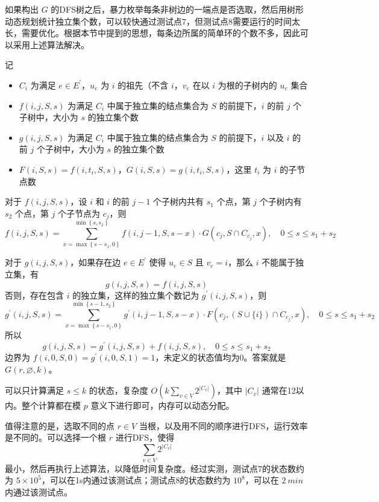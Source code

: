 \documentclass[lang=cn,11pt,a4paper]{elegantpaper}
\begin{document}
如果构出 $G$ 的DFS树之后，暴力枚举每条非树边的一端点是否选取，然后用树形动态规划统计独立集个数，可以较快通过测试点7，但测试点8需要运行的时间太长，需要优化。根据本节中提到的思想，每条边所属的简单环的个数不多，因此可以采用上述算法解决。

记
\begin{itemize}
    \item $C_i$ 为满足 $e \in E^{'}$，$u_e$ 为 $i$ 的祖先（不含 $i$，$v_e$ 在以 $i$ 为根的子树内的 $u_e$ 集合
    \item $f(i, j, S, s)$ 为满足 $C_i$ 中属于独立集的结点集合为 $S$ 的前提下，$i$ 的前 $j$ 个子树中，大小为 $s$ 的独立集个数
    \item $g(i, j, S, s)$ 为满足 $C_i$ 中属于独立集的结点集合为 $S$ 的前提下，$i$ 以及 $i$ 的前 $j$ 个子树中，大小为 $s$ 的独立集个数
    \item $F(i, S, s) = f(i, t_i, S, s)$，$G(i, S, s) = g(i, t_i, S, s)$，这里  $t_i$ 为 $i$ 的子节点数
\end{itemize}

对于 $f(i, j, S, s)$，设 $i$ 和 $i$ 的前 $j - 1$ 个子树内共有 $s_1$ 个点，第 $j$ 个子树内有 $s_2$ 个点，第 $j$ 个子节点为 $c_j$，则
\[f(i, j, S, s)=\sum_{x=\max \left\{s-s_{1}, 0\right\}}^{\min \left\{s, s_{2}\right\}} f(i, j-1, S, s-x) \cdot G\left(c_{j}, S \cap C_{c_{j}}, x\right),\quad 0 \leq s \leq s_{1}+s_{2}\]

对于 $g(i, j, S, s)$，如果存在边 $e \in E^{'}$ 使得 $u_e \in S$ 且 $v_e = i$，那么 $i$ 不能属于独立集，有
\[g(i, j, S, s) = f(i, j, S, s)\]
否则，存在包含 $i$ 的独立集，这样的独立集个数记为 $g^{'}(i, j, S, s)$，则
\[g^{'}(i, j, S, s)=\sum_{x=\max \left\{s-s_{1}, 0\right\}}^{\min \left\{s-1, s_{2}\right\}} g^{'}(i, j-1, S, s-x) \cdot F\left(c_{j},(S \cup\{i\}) \cap C_{c_{j}}, x\right), \quad 0 \leq s \leq s_{1}+s_{2}\]
所以
\[g(i, j, S, s) = g^{'}(i, j, S, s) + f(i, j, S, s), \quad 0 \leq s \leq s_{1}+s_{2}\]
边界为 $f(i, 0, S, 0) = g^{'}(i, 0, S, 1) = 1$，未定义的状态值均为0。答案就是 $G(r, \varnothing, k)$。

可以只计算满足 $s \le k$ 的状态，复杂度 $O(k\sum_{v \in V}2^{|C_v|})$，其中 $|C_v|$ 通常在12以内。整个计算都在模 $p$ 意义下进行即可，内存可以动态分配。

值得注意的是，选取不同的点 $r \in V$ 当根，以及用不同的顺序进行DFS，运行效率是不同的。可以选择一个根 $r$ 进行DFS，使得
\[\sum_{v \in V}2^{|C_v|}\]
最小，然后再执行上述算法，以降低时间复杂度。经过实测，测试点7的状态数约为 $5\times 10^5$，可以在1s内通过该测试点；测试点8的状态数约为 $10^8$，可以在 $\SI{2}{min}$ 内通过该测试点。
\end{document}
